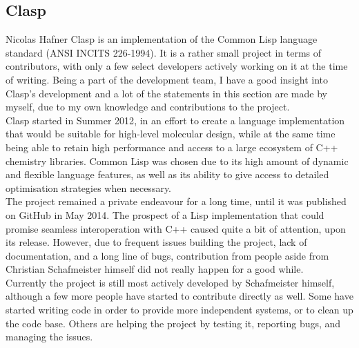 \subsection{Clasp}{Nicolas Hafner}
Clasp\cite{clasp-github} is an implementation of the Common Lisp language standard (ANSI INCITS 226-1994). It is a rather small project in terms of contributors, with only a few select developers actively working on it at the time of writing. Being a part of the development team, I have a good insight into Clasp's development and a lot of the statements in this section are made by myself, due to my own knowledge and contributions to the project. \\

Clasp started in Summer 2012\cite{clasp-timeline}, in an effort to create a language implementation that would be suitable for high-level molecular design, while at the same time being able to retain high performance and access to a large ecosystem of C++ chemistry libraries\cite{clasp-cando}. Common Lisp was chosen due to its high amount of dynamic and flexible language features, as well as its ability to give access to detailed optimisation strategies when necessary\cite{clasp-talk}. \\

The project remained a private endeavour for a long time, until it was published on GitHub in May 2014\cite{clasp-github}. The prospect of a Lisp implementation that could promise seamless interoperation with C++ caused quite a bit of attention, upon its release. However, due to frequent issues building the project, lack of documentation, and a long line of bugs, contribution from people aside from Christian Schafmeister himself did not really happen for a good while. \\

Currently the project is still most actively developed by Schafmeister himself, although a few more people have started to contribute directly as well. Some have started writing code in order to provide more independent systems, or to clean up the code base. Others are helping the project by testing it, reporting bugs, and managing the issues. \\

